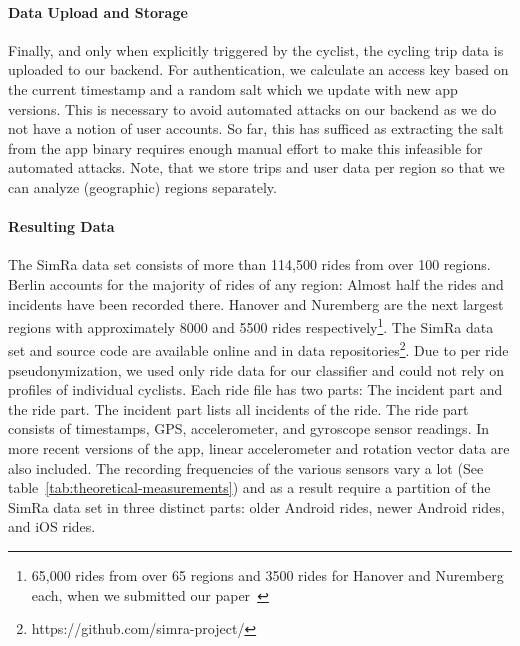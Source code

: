 \paragraph{Data Upload and Storage}
Finally, and only when explicitly triggered by the cyclist, the cycling trip data is uploaded to our backend.
For authentication, we calculate an access key based on the current timestamp and a random salt which we update with new app versions.
This is necessary to avoid automated attacks on our backend as we do not have a notion of user accounts.
So far, this has sufficed as extracting the salt from the app binary requires enough manual effort to make this infeasible for automated attacks.
Note, that we store trips and user data per region so that we can analyze (geographic) regions separately.

\paragraph{Resulting Data}
The SimRa data set consists of more than 114,500 rides from over 100 regions.
Berlin accounts for the majority of rides of any region: Almost half the rides and incidents have been recorded there.
Hanover and Nuremberg are the next largest regions with approximately 8000 and 5500 rides respectively\footnote{65,000 rides from over 65 regions and 3500 rides for Hanover and Nuremberg each, when we submitted our paper~\cite{karakaya2022cyclesense}}.
The SimRa data set and source code are available online and in data repositories\footnote{https://github.com/simra-project/}.
Due to per ride pseudonymization, we used only ride data for our classifier and could not rely on profiles of individual cyclists.
Each ride file has two parts: The incident part and the ride part.
The incident part lists all incidents of the ride.
The ride part consists of timestamps, GPS, accelerometer, and gyroscope sensor readings. In more recent versions of the app, linear accelerometer and rotation vector data are also included.
The recording frequencies of the various sensors vary a lot (See table~\ref{tab:theoretical-measurements}) and as a result require a partition of the SimRa data set in three distinct parts: older Android rides, newer Android rides, and iOS rides.

